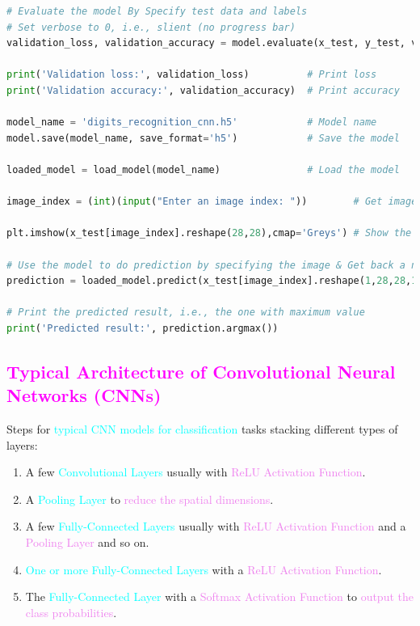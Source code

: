 \documentclass{book}
\begin{document}
\begin{lstlisting}[language=Python, basicstyle=\ttfamily\small, keywordstyle=\color{blue}, commentstyle=\color{forestgreen}, stringstyle=\color{red}, showstringspaces=false]
# Evaluate the model By Specify test data and labels
# Set verbose to 0, i.e., slient (no progress bar)
validation_loss, validation_accuracy = model.evaluate(x_test, y_test, verbose=0)

print('Validation loss:', validation_loss)          # Print loss
print('Validation accuracy:', validation_accuracy)  # Print accuracy

model_name = 'digits_recognition_cnn.h5'            # Model name
model.save(model_name, save_format='h5')            # Save the model

loaded_model = load_model(model_name)               # Load the model

image_index = (int)(input("Enter an image index: "))        # Get image index from user

plt.imshow(x_test[image_index].reshape(28,28),cmap='Greys') # Show the image in greyscale

# Use the model to do prediction by specifying the image & Get back a numpy array of prediction
prediction = loaded_model.predict(x_test[image_index].reshape(1,28,28,1))

# Print the predicted result, i.e., the one with maximum value
print('Predicted result:', prediction.argmax())
\end{lstlisting}
\vspace{3mm}
\textcolor{magenta}{\section{\textbf{Typical Architecture of Convolutional Neural Networks (CNNs)}}}
Steps for \textcolor{cyan}{typical CNN models for classification} tasks stacking different types of layers:
\begin{enumerate}
    \item A few \textcolor{cyan}{Convolutional Layers} usually with \textcolor{violet}{ReLU Activation Function}.
    \item A \textcolor{cyan}{Pooling Layer} to \textcolor{violet}{reduce the spatial dimensions}.
    \item A few \textcolor{cyan}{Fully-Connected Layers} usually with \textcolor{violet}{ReLU Activation Function} and a \textcolor{violet}{Pooling Layer} and so on.
    \item \textcolor{cyan}{One or more Fully-Connected Layers} with a \textcolor{violet}{ReLU Activation Function}.
    \item The \textcolor{cyan}{Fully-Connected Layer} with a \textcolor{violet}{Softmax Activation Function} to \textcolor{violet}{output the class probabilities}.
\end{enumerate}
\end{document}
